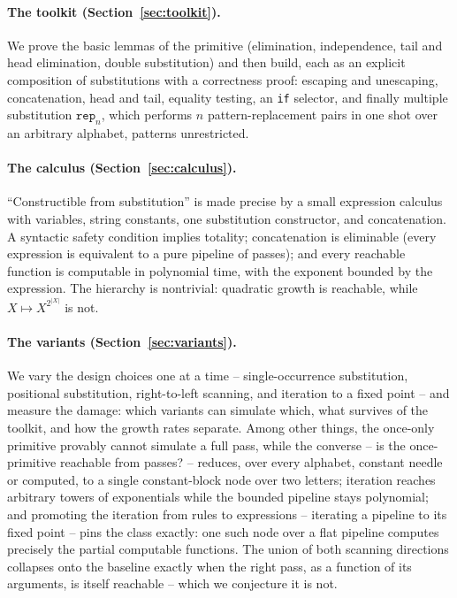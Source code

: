 \documentclass[runningheads,envcountsect]{llncs}
\begin{document}
\paragraph{The toolkit (Section~\ref{sec:toolkit}).} We prove the basic lemmas of the primitive (elimination, independence, tail and head elimination, double substitution) and then build, each as an explicit composition of substitutions with a correctness proof: escaping and unescaping, concatenation, head and tail, equality testing, an \texttt{if} selector, and finally multiple substitution $\mathtt{rep}_n$, which performs $n$ pattern-replacement pairs in one shot over an arbitrary alphabet, patterns unrestricted.

\paragraph{The calculus (Section~\ref{sec:calculus}).} ``Constructible from substitution'' is made precise by a small expression calculus with variables, string constants, one substitution constructor, and concatenation. A syntactic safety condition implies totality; concatenation is eliminable (every expression is equivalent to a pure pipeline of passes); and every reachable function is computable in polynomial time, with the exponent bounded by the expression. The hierarchy is nontrivial: quadratic growth is reachable, while $X \mapsto X^{2^{|X|}}$ is not.

\paragraph{The variants (Section~\ref{sec:variants}).} We vary the design choices one at a time -- single-occurrence substitution, positional substitution, right-to-left scanning, and iteration to a fixed point -- and measure the damage: which variants can simulate which, what survives of the toolkit, and how the growth rates separate. Among other things, the once-only primitive provably cannot simulate a full pass, while the converse -- is the once-primitive reachable from passes? -- reduces, over every alphabet, constant needle or computed, to a single constant-block node over two letters; iteration reaches arbitrary towers of exponentials while the bounded pipeline stays polynomial; and promoting the iteration from rules to expressions -- iterating a pipeline to its fixed point -- pins the class exactly: one such node over a flat pipeline computes precisely the partial computable functions. The union of both scanning directions collapses onto the baseline exactly when the right pass, as a function of its arguments, is itself reachable -- which we conjecture it is not.
\end{document}

